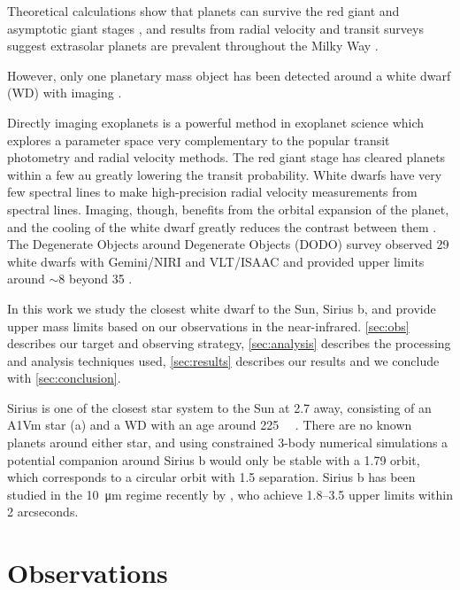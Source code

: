 \documentclass[twocolumn]{aastex631}
\begin{document}
Theoretical calculations show that planets can survive the red giant and asymptotic giant stages \citep{burleigh_imaging_2002,jura_pollution_2008,nordhaus_orbits_2013}, and results from radial velocity and transit surveys suggest extrasolar planets are prevalent throughout the Milky Way \citep{cumming_keck_2008}. 

However, only one planetary mass object has been detected around a white dwarf (WD) with imaging \citep[WD 0806-661;][]{luhman_discovery_2011}.

Directly imaging exoplanets is a powerful method in exoplanet science which explores a parameter space very complementary to the popular transit photometry and radial velocity methods. The red giant stage has cleared planets within a few \unit{au} greatly lowering the transit probability. White dwarfs have very few spectral lines to make high-precision radial velocity measurements from spectral lines. Imaging, though, benefits from the orbital expansion of the planet, and the cooling of the white dwarf greatly reduces the contrast between them \citep{burleigh_imaging_2002,gould_finding_2008}. The Degenerate Objects around Degenerate Objects (DODO) survey observed 29 white dwarfs with Gemini/NIRI and VLT/ISAAC and provided upper limits around $\sim$\qty{8}{\mj} beyond \qty{35}{\au} \citep{hogan_dodo_2009}.

In this work we study the closest white dwarf to the Sun, Sirius b, and provide upper mass limits based on our observations in the near-infrared. \autoref{sec:obs} describes our target and observing strategy, \autoref{sec:analysis} describes the processing and analysis techniques used, \autoref{sec:results} describes our results and we conclude with \autoref{sec:conclusion}.

Sirius is one of the closest star system to the Sun at \qty{2.7}{\parsec} away, consisting of an A1Vm star (a) and a WD with an age around \qty{225}{\mega\year} \citep{bond_sirius_2017,collaboration_gaia_2018}. There are no known planets around either star, and using constrained 3-body numerical simulations a potential companion around Sirius b would only be stable with a \qty{1.79}{\year} orbit, which corresponds to a circular orbit with \qty{1.5}{\au} separation. Sirius b has been studied in the \qty{10}{\micro\meter} regime recently by \cite{pathak_high_2021}, who achieve \qtyrange[]{1.8}{3.5}{\mj} upper limits within 2 arcseconds.


\section{Observations} \label{sec:obs}
\end{document}
